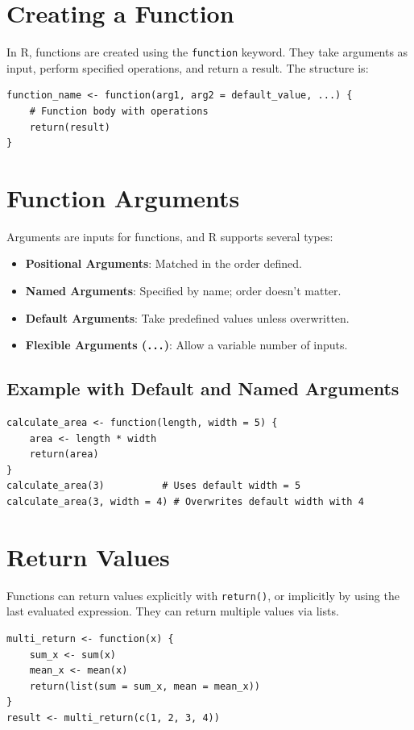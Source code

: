 \documentclass[10pt]{book}
\begin{document}
\section{Creating a Function}
In R, functions are created using the \texttt{function} keyword. They take arguments as input, perform specified operations, and return a result. The structure is:

\begin{lstlisting}
function_name <- function(arg1, arg2 = default_value, ...) {
    # Function body with operations
    return(result)
}
\end{lstlisting}

\section{Function Arguments}
Arguments are inputs for functions, and R supports several types:
\begin{itemize}
    \item \textbf{Positional Arguments}: Matched in the order defined.
    \item \textbf{Named Arguments}: Specified by name; order doesn't matter.
    \item \textbf{Default Arguments}: Take predefined values unless overwritten.
    \item \textbf{Flexible Arguments (\texttt{...})}: Allow a variable number of inputs.
\end{itemize}

\subsection{Example with Default and Named Arguments}
\begin{lstlisting}
calculate_area <- function(length, width = 5) {
    area <- length * width
    return(area)
}
calculate_area(3)          # Uses default width = 5
calculate_area(3, width = 4) # Overwrites default width with 4
\end{lstlisting}

\section{Return Values}
Functions can return values explicitly with \texttt{return()}, or implicitly by using the last evaluated expression. They can return multiple values via lists.

\begin{lstlisting}
multi_return <- function(x) {
    sum_x <- sum(x)
    mean_x <- mean(x)
    return(list(sum = sum_x, mean = mean_x))
}
result <- multi_return(c(1, 2, 3, 4))
\end{lstlisting}
\end{document}
